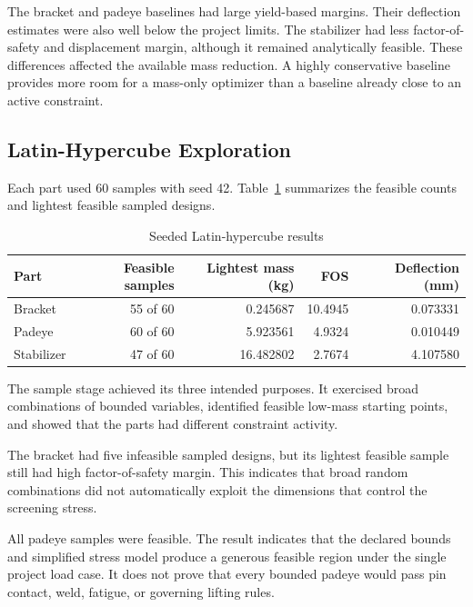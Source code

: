 The bracket and padeye baselines had large yield-based margins. Their
deflection estimates were also well below the project limits. The stabilizer
had less factor-of-safety and displacement margin, although it remained
analytically feasible. These differences affected the available mass
reduction. A highly conservative baseline provides more room for a mass-only
optimizer than a baseline already close to an active constraint.

\subsection{Latin-Hypercube Exploration}
\label{sec:lhs-results}

Each part used 60 samples with seed 42. Table~\ref{tab:lhs-results} summarizes
the feasible counts and lightest feasible sampled designs.

\begin{table}[H]
\centering
\caption{Seeded Latin-hypercube results}
\label{tab:lhs-results}
\begin{tabularx}{\textwidth}{Xrrrr}
\toprule
\textbf{Part} & \textbf{Feasible samples} &
\textbf{Lightest mass (kg)} & \textbf{FOS} &
\textbf{Deflection (mm)}\\
\midrule
Bracket & 55 of 60 & 0.245687 & 10.4945 & 0.073331\\
Padeye & 60 of 60 & 5.923561 & 4.9324 & 0.010449\\
Stabilizer & 47 of 60 & 16.482802 & 2.7674 & 4.107580\\
\bottomrule
\end{tabularx}
\end{table}

The sample stage achieved its three intended purposes. It exercised broad
combinations of bounded variables, identified feasible low-mass starting
points, and showed that the parts had different constraint activity.

The bracket had five infeasible sampled designs, but its lightest feasible
sample still had high factor-of-safety margin. This indicates that broad
random combinations did not automatically exploit the dimensions that control
the screening stress.

All padeye samples were feasible. The result indicates that the declared
bounds and simplified stress model produce a generous feasible region under
the single project load case. It does not prove that every bounded padeye
would pass pin contact, weld, fatigue, or governing lifting rules.


